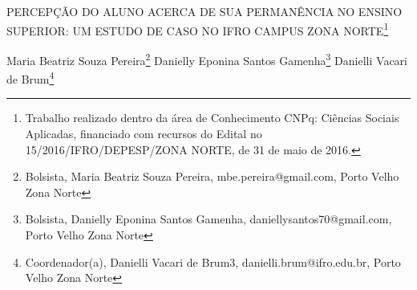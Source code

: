 \documentclass[article,12pt,onesidea,4paper,english,brazil]{abntex2}
\begin{document}
	
	
	\frenchspacing 
	
	\begin{center}
		\LARGE PERCEPÇÃO DO ALUNO ACERCA DE SUA PERMANÊNCIA NO ENSINO
		SUPERIOR: UM ESTUDO DE CASO NO IFRO CAMPUS ZONA NORTE\footnote{Trabalho realizado dentro da área de Conhecimento CNPq: Ciências Sociais Aplicadas, financiado
			com recursos do Edital no 15/2016/IFRO/DEPESP/ZONA NORTE, de 31 de maio de 2016.}
		
		\normalsize
		Maria Beatriz Souza Pereira\footnote{Bolsista, Maria Beatriz Souza Pereira, mbe.pereira@gmail.com, Porto Velho Zona Norte} 
		Danielly Eponina Santos Gamenha\footnote{Bolsista, Danielly Eponina Santos Gamenha, daniellysantos70@gmail.com, Porto Velho Zona Norte} 
		Danielli Vacari de Brum\footnote{Coordenador(a), Danielli Vacari de Brum3, danielli.brum@ifro.edu.br, Porto Velho Zona Norte} 
		
	\end{center}
	
\end{document}
